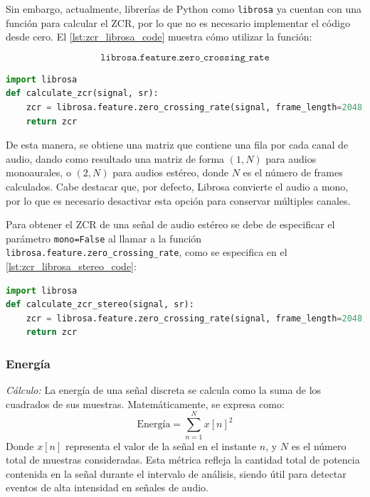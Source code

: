 Sin embargo, actualmente, librerías de Python como \texttt{librosa} \cite{mcfee_librosa_2025} ya cuentan con una función para calcular el ZCR, por lo que no es necesario implementar el código desde cero. El \autoref{lst:zcr_librosa_code} muestra cómo utilizar la función:

\[
    \texttt{librosa.feature.zero\_crossing\_rate}
\]

\begin{lstlisting}[language=Python, label={lst:zcr_librosa_code}, caption={Cálculo de Zero Crossing Rate (ZCR) utilizando librosa en Python}]
import librosa
def calculate_zcr(signal, sr):
    zcr = librosa.feature.zero_crossing_rate(signal, frame_length=2048, hop_length=512)
    return zcr
\end{lstlisting}

De esta manera, se obtiene una matriz que contiene una fila por cada canal de audio, dando como resultado una matriz de forma $(1, N)$ para audios monoaurales, o $(2, N)$ para audios estéreo, donde $N$ es el número de frames calculados. Cabe destacar que, por defecto, Librosa convierte el audio a mono, por lo que es necesario desactivar esta opción para conservar múltiples canales.

Para obtener el ZCR de una señal de audio estéreo se debe de especificar el parámetro \texttt{mono=False} al llamar a la función \texttt{librosa.feature.zero\_crossing\_rate}, como se especifica en el \autoref{lst:zcr_librosa_stereo_code}:

\begin{lstlisting}[language=Python, label={lst:zcr_librosa_stereo_code}, caption={Cálculo de Zero Crossing Rate (ZCR) para audio estéreo utilizando librosa en Python}]
import librosa
def calculate_zcr_stereo(signal, sr):
    zcr = librosa.feature.zero_crossing_rate(signal, frame_length=2048, hop_length=512, mono=False)
    return zcr
\end{lstlisting}

\subsubsection{Energía}
\textit{Cálculo:} La energía de una señal discreta se calcula como la suma de los cuadrados de sus muestras. Matemáticamente, se expresa como:
\[
    \text{Energía} = \sum_{n=1}^{N} x[n]^2
\]
Donde $x[n]$ representa el valor de la señal en el instante $n$, y $N$ es el número total de muestras consideradas. Esta métrica refleja la cantidad total de potencia contenida en la señal durante el intervalo de análisis, siendo útil para detectar eventos de alta intensidad en señales de audio.

